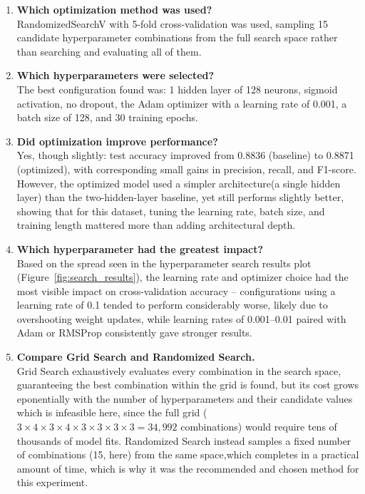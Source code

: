 \documentclass[11pt]{article}
\begin{document}
\begin{enumerate}[label=\arabic*.]

\item \textbf{Which optimization method was used?}\\
RandomizedSearchV with 5-fold cross-validation was used, sampling 15
candidate hyperparameter combinations from the full search space rather than
searching and evaluating all of them.

\item \textbf{Which hyperparameters were selected?}\\
The best configuration found was: 1 hidden layer of 128 neurons, sigmoid
activation, no dropout, the Adam optimizer with a learning rate of 0.001,
a batch size of 128, and 30 training epochs.

\item \textbf{Did optimization improve performance?}\\
Yes, though slightly: test accuracy improved from 0.8836 (baseline) to 0.8871
(optimized), with corresponding small gains in precision, recall, and
F1-score. However, the optimized model used a simpler architecture(a single hidden layer) than the two-hidden-layer baseline, yet still performs
slightly better, showing that for this dataset, tuning the learning rate,
batch size, and training length mattered more than adding architectural depth.

\item \textbf{Which hyperparameter had the greatest impact?}\\
Based on the spread seen in the hyperparameter search results plot
(Figure~\ref{fig:search_results}), the learning rate and optimizer choice had
the most visible impact on cross-validation accuracy -- configurations using a
learning rate of 0.1 tended to perform considerably worse, likely due to
overshooting weight updates, while learning rates of 0.001--0.01
paired with Adam or RMSProp consistently gave stronger results.

\item \textbf{Compare Grid Search and Randomized Search.}\\
Grid Search exhaustively evaluates every combination in the search space,
guaranteeing the best combination within the grid is found, but its
cost grows eponentially with the number of hyperparameters and their
candidate values which is infeasible here, since the full grid
($3\times4\times3\times4\times3\times3\times3\times3 = 34{,}992$ combinations)
would require tens of thousands of model fits. Randomized Search instead
samples a fixed number of combinations (15, here) from the same space,which completes in a
practical amount of time, which is why it was the recommended and chosen
method for this experiment.


\end{enumerate}
\end{document}
